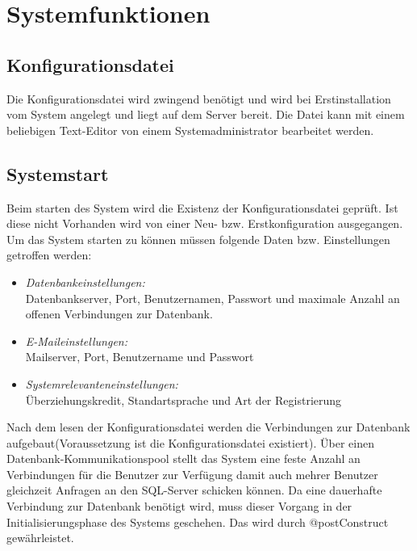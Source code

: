 \chapter{Systemfunktionen}

\section{Konfigurationsdatei}
	
		Die Konfigurationsdatei wird zwingend benötigt und wird bei Erstinstallation vom System angelegt und liegt auf dem Server bereit. Die Datei kann mit einem beliebigen Text-Editor von einem Systemadministrator bearbeitet werden.
	

\section{Systemstart}
		Beim starten des System wird die Existenz der Konfigurationsdatei geprüft. Ist diese nicht Vorhanden wird von einer Neu- bzw. Erstkonfiguration ausgegangen. Um das System starten zu können müssen folgende Daten bzw. Einstellungen getroffen werden:
		\begin{itemize}
			\item \emph{Datenbankeinstellungen:}\\
			 Datenbankserver, Port, Benutzernamen, Passwort und maximale Anzahl an offenen Verbindungen zur Datenbank.
			\item \emph{E-Maileinstellungen:}\\
			 Mailserver, Port, Benutzername und Passwort
			\item \emph{Systemrelevanteneinstellungen:}\\
			 Überziehungskredit, Standartsprache und Art der Registrierung
		\end{itemize}
		Nach dem lesen der Konfigurationsdatei werden die Verbindungen zur Datenbank aufgebaut(Voraussetzung ist die Konfigurationsdatei existiert). Über einen Datenbank-Kommunikationspool stellt das System eine feste Anzahl an Verbindungen für die Benutzer zur Verfügung damit auch mehrer Benutzer gleichzeit Anfragen an den SQL-Server schicken können. Da eine dauerhafte Verbindung zur Datenbank benötigt wird, muss dieser Vorgang in der Initialisierungsphase des Systems geschehen. Das wird durch @postConstruct gewährleistet. 
	
